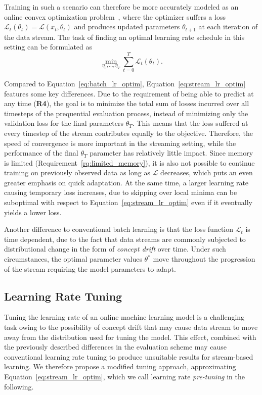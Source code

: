 \documentclass[runningheads]{llncs}
\begin{document}
Training in such a scenario can therefore be more accurately modeled as an online convex optimization problem~\cite{shalev-shwartzOnlineLearningOnline2011,hazanIntroductionOnlineConvex2016}, where the optimizer suffers a loss $\mathcal{L}_t(\theta_t) = \mathcal{L}(x_t, \theta_{t})$ and produces updated parameters $\theta_{t+1}$ at each iteration of the data stream.
The task of finding an optimal learning rate schedule in this setting can be formulated as
\begin{equation}
	\label{eq:stream_lr_optim}
	\min_{\eta_0, \ldots, \eta_T} \sum_{t=0}^{T} \mathcal{L}_t(\theta_t).
\end{equation}

Compared to Equation~\eqref{eq:batch_lr_optim}, Equation~\eqref{eq:stream_lr_optim} features some key differences.
Due to the requirement of being able to predict at any time (\textbf{R4}), the goal is to minimize the total sum of losses incurred over all timesteps of the prequential evaluation process, instead of minimizing only the validation loss for the final parameters $\theta_T$.
This means that the loss suffered at every timestep of the stream contributes equally to the objective.
Therefore, the speed of convergence is more important in the streaming setting, while the performance of the final $\theta_T$ parameter has relatively little impact.
Since memory is limited (Requirement~\ref{rq:limited_memory}), it is also not possible to continue training on previously observed data as long as $\mathcal{L}$ decreases, which puts an even greater emphasis on quick adaptation.
At the same time, a larger learning rate causing temporary loss increases, due to skipping over local minima can be suboptimal with respect to Equation~\eqref{eq:stream_lr_optim} even if it eventually yields a lower loss.

Another difference to conventional batch learning is that the loss function $\mathcal{L}_t$ is time dependent, due to the fact that data streams are commonly subjected to distributional change in the form of \textit{concept drift} over time.
Under such circumstances, the optimal parameter values $\theta^*$ move throughout the progression of the stream requiring the model parameters to adapt.

\subsection{Learning Rate Tuning}\label{subsec:pre-tuning}

Tuning the learning rate of an online machine learning model is a challenging task owing to the possibility of concept drift that may cause data stream to move away from the distribution used for tuning the model.
This effect, combined with the previously described differences in the evaluation scheme may cause conventional learning rate tuning to produce unsuitable results for stream-based learning.
We therefore propose a modified tuning approach, approximating Equation~\eqref{eq:stream_lr_optim}, which we call learning rate \textit{pre-tuning} in the following.
\end{document}

